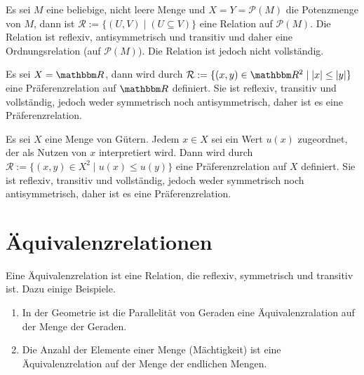 \begin{Unit}[Beispiel] 
  Es sei $M$ eine beliebige, nicht leere Menge und $X = Y = \mathcal{P}(M)$ 
  die Potenzmenge von $M$, dann ist $\mathcal{R} := \{ (U,V) \mid 
  (U \subseteq V)\}$ eine Relation auf $\mathcal{P}(M)$. Die Relation ist 
  reflexiv, antisymmetrisch und transitiv und daher eine Ordnungsrelation 
  (auf $\mathcal{P}(M)$). Die  Relation ist jedoch nicht vollständig.
\end{Unit}

\begin{Unit}[Beispiel] 
  Es sei $X = \RR$, dann wird durch $\mathcal{R} := \{ (x,y) \in \RR^2 
  \mid |x| \leq |y| \}$ eine Präferenzrelation auf $\RR$ definiert. Sie ist
  reflexiv, transitiv und vollständig, jedoch weder symmetrisch noch
  antisymmetrisch, daher ist es eine Präferenzrelation.
\end{Unit}

\begin{Unit}[Beispiel] 
  Es sei $X$ eine Menge von Gütern. Jedem $x \in X$ sei ein Wert $u(x)$ 
  zugeordnet, der als Nutzen von $x$ interpretiert wird. Dann wird durch 
  $\mathcal{R} := \{ (x,y) \in X^2 \mid u(x) \leq u(y) \}$ eine
  Präferenzrelation auf $X$ definiert. Sie ist reflexiv, transitiv und 
  vollständig, jedoch weder symmetrisch noch antisymmetrisch, daher ist es 
  eine Präferenzrelation.
\end{Unit}

\section{Äquivalenzrelationen}
\label{sec:Relationen:Aequivalenzrelationen}

\begin{Unit}[Beispiel]
Eine Äquivalenzrelation ist eine Relation, die reflexiv, symmetrisch und 
transitiv ist. Dazu einige Beispiele.

\begin{enumerate}
\item 
  In der Geometrie ist die Parallelität von Geraden eine Äquivalenzralation 
  auf der Menge der Geraden.
\item
  Die Anzahl der Elemente einer Menge (Mächtigkeit) ist eine 
  Äquivalenzrelation auf der Menge der endlichen Mengen.
\end{enumerate}
\end{Unit}

